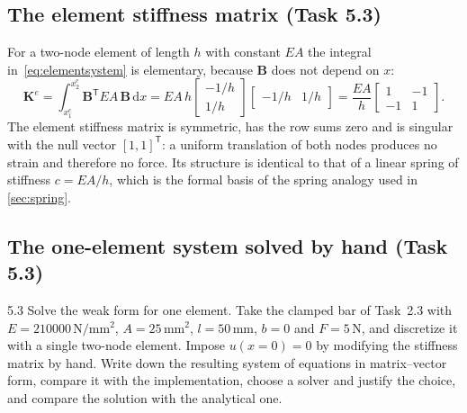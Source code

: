 \documentclass[11pt,a4paper]{article}
\numberwithin{equation}{section}
\theoremstyle{remark}
\newcommand{\bB}{\bm{B}}
\newcommand{\bK}{\bm{K}}
\begin{document}
\subsection{The element stiffness matrix (Task 5.3)}\label{sec:kelem}

For a two-node element of length $h$ with constant $EA$ the integral
in~\eqref{eq:elementsystem} is elementary, because $\bB$ does not depend on $x$:
\begin{equation}\label{eq:Ke}
  \bK^e = \int_{x_1^e}^{x_2^e} \bB^{\mathsf{T}}EA\,\bB\,\mathrm{d}x
  = EA\,h\begin{bmatrix} -1/h \\ 1/h \end{bmatrix}
         \begin{bmatrix} -1/h & 1/h \end{bmatrix}
  = \frac{EA}{h}\begin{bmatrix} 1 & -1 \\ -1 & 1 \end{bmatrix} .
\end{equation}
The element stiffness matrix is symmetric, has the row sums zero and is singular with the
null vector $[1,1]^{\mathsf{T}}$: a uniform translation of both nodes produces no strain
and therefore no force. Its structure is identical to that of a linear spring of stiffness
$c = EA/h$, which is the formal basis of the spring analogy used in \cref{sec:spring}.

\subsection{The one-element system solved by hand (Task 5.3)}\label{sec:oneelement}

\begin{task}{5.3}
  Solve the weak form for one element. Take the clamped bar of Task~2.3 with
  $E = \num{210000}\,\mathrm{N/mm^2}$, $A = 25\,\mathrm{mm^2}$, $l = 50\,\mathrm{mm}$,
  $b = 0$ and $F = 5\,\mathrm{N}$, and discretize it with a single two-node element.
  Impose $u(x=0) = 0$ by modifying the stiffness matrix by hand. Write down the resulting
  system of equations in matrix--vector form, compare it with the implementation, choose a
  solver and justify the choice, and compare the solution with the analytical one.
\end{task}
\end{document}
